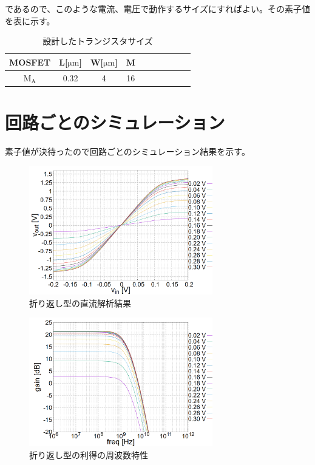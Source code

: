 \documentclass[twocolumn]{jsarticle}
\begin{document}
        であるので、このような電流、電圧で動作するサイズにすればよい。その素子値を表に示す。
        \begin{table}[H]
            \caption{設計したトランジスタサイズ}
            \label{table:buf_size}
            \centering
            \begin{tabular}{cccccccccc}
                MOSFET & L[$\mathrm{\mu m}$] & W[$\mathrm{\mu m}$] & M\\
                \hline \hline
                $\mathrm{M_{A}}$ & 0.32 & 4 & 16 \\
            \end{tabular}
            \end{table}
                
    

\section{回路ごとのシミュレーション}
    素子値が決待ったので回路ごとのシミュレーション結果を示す。
    \begin{figure}[H]
        \begin{center}
            \includegraphics*[width = 80mm]{figures/NtoN_dc.PNG}
            \caption{折り返し型の直流解析結果}
            \label{fig:sim_NtoN_dc}
        \end{center}
    \end{figure}
    \begin{figure}[H]
        \begin{center}
            \includegraphics*[width = 80mm]{figures/NtoN_ac_gain.PNG}
            \caption{折り返し型の利得の周波数特性}
            \label{fig:sim_NtoN_ac_gain}
        \end{center}
    \end{figure}
\end{document}
